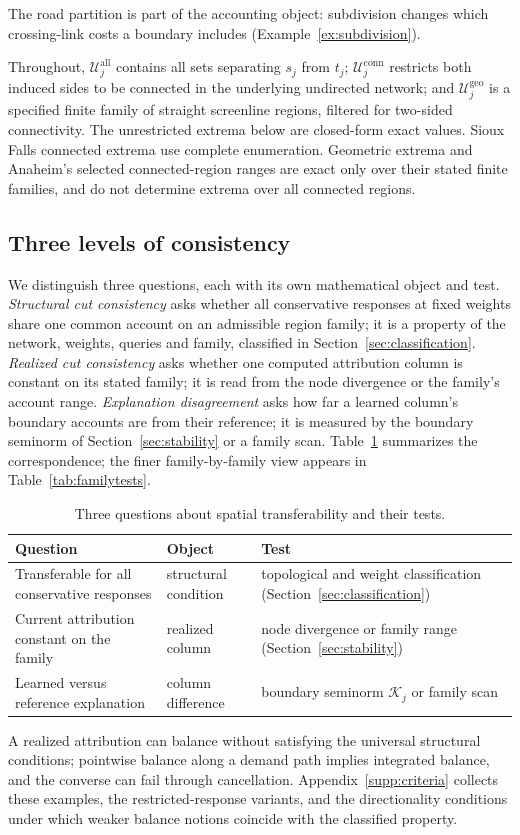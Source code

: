 \documentclass[a4paper,fleqn]{cas-sc}
\begin{document}
The road partition is part of the accounting object: subdivision changes
which crossing-link costs a boundary includes (Example~\ref{ex:subdivision}).

Throughout, $\mathcal U_j^{\mathrm{all}}$ contains all sets separating
$s_j$ from $t_j$; $\mathcal U_j^{\mathrm{conn}}$ restricts both induced sides
to be connected in the underlying undirected network; and
$\mathcal U_j^{\mathrm{geo}}$ is a specified finite family of straight
screenline regions, filtered for two-sided connectivity.
The unrestricted extrema below are closed-form exact values. Sioux Falls
connected extrema use complete enumeration. Geometric extrema and Anaheim's
selected connected-region ranges are exact only over their stated finite
families, and do not determine extrema over all connected regions.

\subsection{Three levels of consistency}\label{sec:levels}\label{sec:hierarchy}
We distinguish three questions, each with its own mathematical object and
test. \emph{Structural cut consistency} asks whether all conservative
responses at fixed weights share one common account on an admissible region
family; it is a property of the network, weights, queries and family,
classified in Section~\ref{sec:classification}. \emph{Realized cut
consistency} asks whether one computed attribution column is constant on
its stated family; it is read from the node divergence or the family's
account range. \emph{Explanation disagreement} asks how far a learned
column's boundary accounts are from their reference; it is measured by
the boundary seminorm of Section~\ref{sec:stability} or a family scan.
Table~\ref{tab:threequestions} summarizes the correspondence; the finer
family-by-family view appears in Table~\ref{tab:familytests}.
\begin{table}[pos=tb]
\caption{Three questions about spatial transferability and their tests.}
\label{tab:threequestions}
\begin{tabular*}{\tblwidth}{@{}p{6.2cm}p{4.2cm}p{4.6cm}@{}}
\toprule Question & Object & Test\\\midrule
Transferable for all conservative responses & structural condition & topological and weight classification (Section~\ref{sec:classification})\\
Current attribution constant on the family & realized column & node divergence or family range (Section~\ref{sec:stability})\\
Learned versus reference explanation & column difference & boundary seminorm $\mathcal K_j$ or family scan\\
\bottomrule\end{tabular*}\end{table}
A realized attribution can balance without satisfying the universal
structural conditions; pointwise balance along a demand path implies
integrated balance, and the converse can fail through cancellation.
Appendix~\ref{supp:criteria} collects these examples, the
restricted-response variants, and the directionality conditions under
which weaker balance notions coincide with the classified property.
\end{document}
